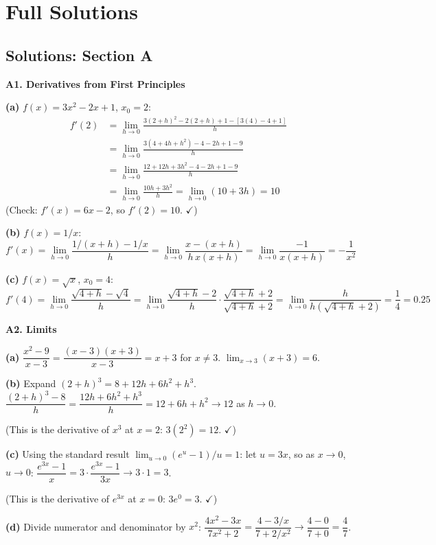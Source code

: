 \documentclass[12pt, a4paper]{article}
\theoremstyle{definition}
\begin{document}
\newpage

\section{Full Solutions}

\subsection{Solutions: Section A}

\begin{solbox}
\textbf{A1. Derivatives from First Principles}

\textbf{(a)} $f(x)=3x^2-2x+1$, $x_0=2$:
\begin{align*}
  f'(2) &= \lim_{h\to 0}\frac{3(2+h)^2-2(2+h)+1 - [3(4)-4+1]}{h}\\
        &= \lim_{h\to 0}\frac{3(4+4h+h^2)-4-2h+1 - 9}{h}\\
        &= \lim_{h\to 0}\frac{12+12h+3h^2-4-2h+1-9}{h}\\
        &= \lim_{h\to 0}\frac{10h+3h^2}{h}
         = \lim_{h\to 0}(10+3h) = 10
\end{align*}
(Check: $f'(x)=6x-2$, so $f'(2)=10$. $\checkmark$)

\textbf{(b)} $f(x)=1/x$:
\[
  f'(x) = \lim_{h\to 0}\frac{1/(x+h)-1/x}{h}
         = \lim_{h\to 0}\frac{x-(x+h)}{h\,x(x+h)}
         = \lim_{h\to 0}\frac{-1}{x(x+h)}
         = -\frac{1}{x^2}
\]

\textbf{(c)} $f(x)=\sqrt{x}$, $x_0=4$:
\[
  f'(4) = \lim_{h\to 0}\frac{\sqrt{4+h}-\sqrt{4}}{h}
         = \lim_{h\to 0}\frac{\sqrt{4+h}-2}{h}
         \cdot\frac{\sqrt{4+h}+2}{\sqrt{4+h}+2}
         = \lim_{h\to 0}\frac{h}{h(\sqrt{4+h}+2)}
         = \frac{1}{4} = 0.25
\]
\end{solbox}

\begin{solbox}
\textbf{A2. Limits}

\textbf{(a)} $\dfrac{x^2-9}{x-3} = \dfrac{(x-3)(x+3)}{x-3} = x+3$ for $x\neq 3$.
$\displaystyle\lim_{x\to 3}(x+3) = 6$.

\textbf{(b)} Expand $(2+h)^3 = 8+12h+6h^2+h^3$.
$\dfrac{(2+h)^3-8}{h} = \dfrac{12h+6h^2+h^3}{h} = 12+6h+h^2 \to 12$ as $h\to 0$.

(This is the derivative of $x^3$ at $x=2$: $3(2^2)=12$. $\checkmark$)

\textbf{(c)} Using the standard result $\lim_{u\to 0}(e^u-1)/u = 1$:
let $u=3x$, so as $x\to 0$, $u\to 0$:
$\dfrac{e^{3x}-1}{x} = 3\cdot\dfrac{e^{3x}-1}{3x} \to 3\cdot 1 = 3$.

(This is the derivative of $e^{3x}$ at $x=0$: $3e^0=3$. $\checkmark$)

\textbf{(d)} Divide numerator and denominator by $x^2$:
$\dfrac{4x^2-3x}{7x^2+2} = \dfrac{4-3/x}{7+2/x^2} \to \dfrac{4-0}{7+0} = \dfrac{4}{7}$.
\end{solbox}
\end{document}

